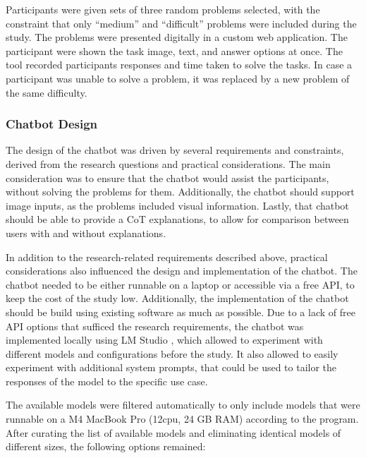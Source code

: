 Participants were given sets of three random problems selected, with the constraint that only “medium” and “difficult” problems were included during the study. The problems were presented digitally in a custom web application. The participant were shown the task image, text, and answer options at once. The tool recorded participants responses and time taken to solve the tasks. In case a participant was unable to solve a problem, it was replaced by a new problem of the same difficulty.

\subsubsection{Chatbot Design} \label{sssec:chatbot_design}

The design of the chatbot was driven by several requirements and constraints, derived from the research questions and practical considerations. The main consideration was to ensure that the chatbot would assist the participants, without solving the problems for them. Additionally, the chatbot should support image inputs, as the problems included visual information. Lastly, that chatbot should be able to provide a \ac{CoT} explanations, to allow for comparison between users with and without explanations.

In addition to the research-related requirements described above, practical considerations also influenced the design and implementation of the chatbot. The chatbot needed to be either runnable on a laptop or accessible via a free API, to keep the cost of the study low. Additionally, the implementation of the chatbot should be build using existing software as much as possible. Due to a lack of free API options that sufficed the research requirements, the chatbot was implemented locally using LM Studio \parencite{ElementLabs2025}, which allowed to experiment with different models and configurations before the study. It also allowed to easily experiment with additional system prompts, that could be used to tailor the responses of the model to the specific use case.

The available models were filtered automatically to only include models that were runnable on a M4 MacBook Pro (12cpu, 24 GB RAM) according to the program. After curating the list of available models and eliminating identical models of different sizes, the following options remained:

